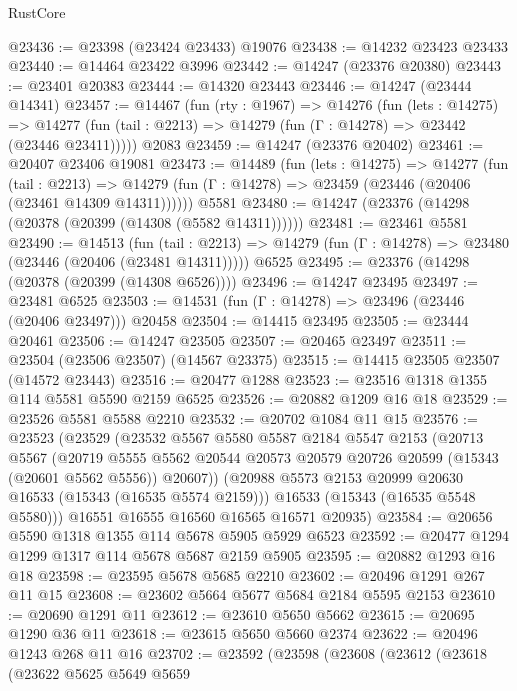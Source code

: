 \begin{lexlean}{RustCore}
\begin{coremodule}
@23436 := @23398 (@23424 @23433) @19076
@23438 := @14232 @23423 @23433
@23440 := @14464 @23422 @3996
@23442 := @14247 (@23376 @20380)
@23443 := @23401 @20383
@23444 := @14320 @23443
@23446 := @14247 (@23444 @14341)
@23457 := @14467
    (fun (rty : @1967) =>
    @14276
      (fun (lets : @14275) =>
      @14277 (fun (tail : @2213) => @14279 (fun (Γ : @14278) => @23442 (@23446 @23411)))))
    @2083
@23459 := @14247 (@23376 @20402)
@23461 := @20407 @23406 @19081
@23473 := @14489
    (fun (lets : @14275) =>
    @14277
      (fun (tail : @2213) =>
      @14279 (fun (Γ : @14278) => @23459 (@23446 (@20406 (@23461 @14309 @14311))))))
    @5581
@23480 := @14247 (@23376 (@14298 (@20378 (@20399 (@14308 (@5582 @14311))))))
@23481 := @23461 @5581
@23490 := @14513
    (fun (tail : @2213) => @14279 (fun (Γ : @14278) => @23480 (@23446 (@20406 (@23481 @14311)))))
    @6525
@23495 := @23376 (@14298 (@20378 (@20399 (@14308 @6526))))
@23496 := @14247 @23495
@23497 := @23481 @6525
@23503 := @14531 (fun (Γ : @14278) => @23496 (@23446 (@20406 @23497))) @20458
@23504 := @14415 @23495
@23505 := @23444 @20461
@23506 := @14247 @23505
@23507 := @20465 @23497
@23511 := @23504 (@23506 @23507) (@14567 @23375)
@23515 := @14415 @23505 @23507 (@14572 @23443)
@23516 := @20477 @1288
@23523 := @23516 @1318 @1355 @114 @5581 @5590 @2159 @6525
@23526 := @20882 @1209 @16 @18
@23529 := @23526 @5581 @5588 @2210
@23532 := @20702 @1084 @11 @15
@23576 := @23523
    (@23529
      (@23532
        @5567
        @5580
        @5587
        @2184
        @5547
        @2153
        (@20713
          @5567
          (@20719
            @5555
            @5562
            @20544
            @20573
            @20579
            @20726
            @20599
            (@15343 (@20601 @5562 @5556))
            @20607))
        (@20988 @5573 @2153 @20999 @20630 @16533 (@15343 (@16535 @5574 @2159)))
        @16533
        (@15343 (@16535 @5548 @5580)))
      @16551
      @16555
      @16560
      @16565
      @16571
      @20935)
@23584 := @20656 @5590 @1318 @1355 @114 @5678 @5905 @5929 @6523
@23592 := @20477 @1294 @1299 @1317 @114 @5678 @5687 @2159 @5905
@23595 := @20882 @1293 @16 @18
@23598 := @23595 @5678 @5685 @2210
@23602 := @20496 @1291 @267 @11 @15
@23608 := @23602 @5664 @5677 @5684 @2184 @5595 @2153
@23610 := @20690 @1291 @11
@23612 := @23610 @5650 @5662
@23615 := @20695 @1290 @36 @11
@23618 := @23615 @5650 @5660 @2374
@23622 := @20496 @1243 @268 @11 @16
@23702 := @23592
    (@23598
      (@23608
        (@23612
          (@23618
            (@23622
              @5625
              @5649
              @5659

\end{coremodule}
\end{lexlean}
